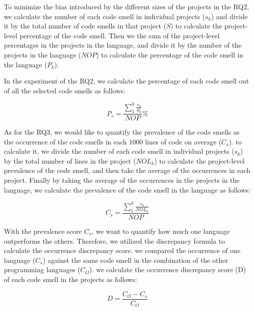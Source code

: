  To minimize the bias introduced by the different sizes of the projects in the
 RQ2, we calculate the number of each code smell in individual projects
 ($s_{k}$) and divide it by the total number of code smells in that project
 ({$S$}) to calculate the project-level percentage of the code smell. Then we
 the sum of the project-level percentages in the projects in the language, and
 divide it by the number of the projects in the language ($NOP$) to calculate
 the percentage of the code smell in the language ($P_{k}$).

In the experiment of the RQ2, we calculate the percentage of each code smell
out of all the selected code smells as follows:

\vspace{-1em}

\begin{equation}
    P_{s} = \frac{\sum_{1}^{k}\frac{{s_{k}}}{S_{k}}}{NOP}\%
\end{equation}

As for the RQ3, we would like to quantify the prevalence of the code smells as
the occurrence of the code smells in each 1000 lines of code on average
($C_{s}$). to calculate it, we divide the number of each code smell in
individual projects ($s_{k}$) by the total number of lines in the project
($NOL_{k}$) to calculate the project-level prevalence of the code smell, and
then take the average of the occurrences in each project. Finally by taking the
average of the occurrences in the projects in the language, we calculate the
prevalence of the code smell in the language as follows:

\vspace{-1.0em}

\begin{equation}
    C_{s} = \frac{\sum_{1}^{k}{\frac{s_{k}}{NOL_{k}}}}{NOP}
\end{equation}

With the prevalence score $C_{s}$, we want to quantify how much one language
outperforms the others. Therefore, we utilized the discrepancy formula to
calculate the occurrence discrepancy score. we compared the occurrence of one
language ($C_{s}$) against the same code smell in the combination of the other
programming languages ($C_{O}$). we calculate the occurrence discrepancy score
(D) of each code smell in the projects as follows:

\vspace{-1.0em}

\begin{equation}
    D = \frac{C_{O} - C_{s}}{C_{O}}
\end{equation}

